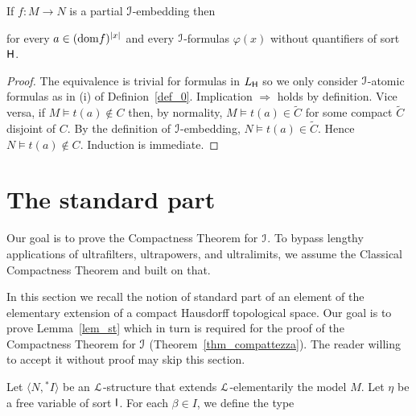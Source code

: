 \documentclass[10pt,oneside]{amsproc}
\begin{document}
\begin{fact}
  If $f:M\to N$ is a partial ${\EuScript I}$-embedding then 


  for every $a\in({\rm dom }f)^{|x|}$ and every ${\EuScript I}$-formulas $\varphi(x)$ without quantifiers of sort ${\sf H}$.
\end{fact}

\begin{proof}
  The equivalence is trivial for formulas in $L_{\sf H}$ so we only consider ${\EuScript I}$-atomic formulas as in (i) of Definion~\ref{def_0}.
  Implication $\Rightarrow$ holds by definition. 
  Vice versa, if $M\models t(a)\notin C$ then, by normality,  $M\models t(a)\in\tilde{C}$ for some compact $\tilde C$ disjoint of $C$.
  By the definition of ${\EuScript I}$-embedding, $N\models t(a)\in\tilde{C}$.
  Hence $N\models t(a)\notin C$.
  Induction is immediate.
\end{proof}



\section{The standard part}\label{standard_part}

Our goal is to prove the Compactness Theorem for ${\EuScript I}$.
To bypass lengthy applications of ultrafilters, ultrapowers, and ultralimits, %
we assume the Classical Compactness Theorem and built on that.

In this section we recall the notion of standard part of an element of the elementary extension of a compact Hausdorff topological space.
Our goal is to prove Lemma~\ref{lem_st} which in turn is required for the proof of the Compactness Theorem for ${\EuScript I}$ (Theorem~\ref{thm_compattezza}).
The reader willing to accept it without proof may skip this section.

Let $\langle N, {}^*\!I\rangle$ be an ${\EuScript L}$-structure that extends ${\EuScript L}$-elementarily the model $M$. %
Let $\eta$ be a free variable of sort ${\sf I}$.
For each $\beta\in I$, we define the type

\end{document}
